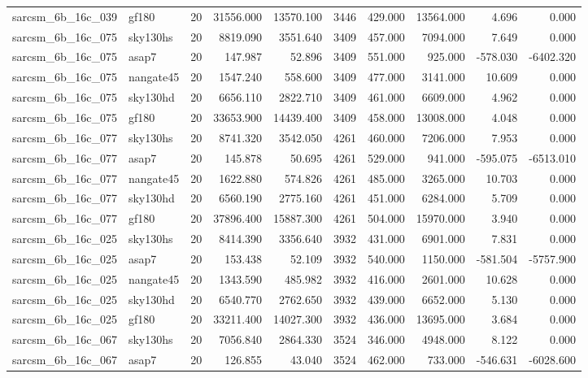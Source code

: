 \begin{longtable}{llrrrrrrrr}
sarcsm\_6b\_16c\_039 & gf180 & 20 & 31556.000 & 13570.100 & 3446 & 429.000 & 13564.000 & 4.696 & 0.000 \\
sarcsm\_6b\_16c\_075 & sky130hs & 20 & 8819.090 & 3551.640 & 3409 & 457.000 & 7094.000 & 7.649 & 0.000 \\
sarcsm\_6b\_16c\_075 & asap7 & 20 & 147.987 & 52.896 & 3409 & 551.000 & 925.000 & -578.030 & -6402.320 \\
sarcsm\_6b\_16c\_075 & nangate45 & 20 & 1547.240 & 558.600 & 3409 & 477.000 & 3141.000 & 10.609 & 0.000 \\
sarcsm\_6b\_16c\_075 & sky130hd & 20 & 6656.110 & 2822.710 & 3409 & 461.000 & 6609.000 & 4.962 & 0.000 \\
sarcsm\_6b\_16c\_075 & gf180 & 20 & 33653.900 & 14439.400 & 3409 & 458.000 & 13008.000 & 4.048 & 0.000 \\
sarcsm\_6b\_16c\_077 & sky130hs & 20 & 8741.320 & 3542.050 & 4261 & 460.000 & 7206.000 & 7.953 & 0.000 \\
sarcsm\_6b\_16c\_077 & asap7 & 20 & 145.878 & 50.695 & 4261 & 529.000 & 941.000 & -595.075 & -6513.010 \\
sarcsm\_6b\_16c\_077 & nangate45 & 20 & 1622.880 & 574.826 & 4261 & 485.000 & 3265.000 & 10.703 & 0.000 \\
sarcsm\_6b\_16c\_077 & sky130hd & 20 & 6560.190 & 2775.160 & 4261 & 451.000 & 6284.000 & 5.709 & 0.000 \\
sarcsm\_6b\_16c\_077 & gf180 & 20 & 37896.400 & 15887.300 & 4261 & 504.000 & 15970.000 & 3.940 & 0.000 \\
sarcsm\_6b\_16c\_025 & sky130hs & 20 & 8414.390 & 3356.640 & 3932 & 431.000 & 6901.000 & 7.831 & 0.000 \\
sarcsm\_6b\_16c\_025 & asap7 & 20 & 153.438 & 52.109 & 3932 & 540.000 & 1150.000 & -581.504 & -5757.900 \\
sarcsm\_6b\_16c\_025 & nangate45 & 20 & 1343.590 & 485.982 & 3932 & 416.000 & 2601.000 & 10.628 & 0.000 \\
sarcsm\_6b\_16c\_025 & sky130hd & 20 & 6540.770 & 2762.650 & 3932 & 439.000 & 6652.000 & 5.130 & 0.000 \\
sarcsm\_6b\_16c\_025 & gf180 & 20 & 33211.400 & 14027.300 & 3932 & 436.000 & 13695.000 & 3.684 & 0.000 \\
sarcsm\_6b\_16c\_067 & sky130hs & 20 & 7056.840 & 2864.330 & 3524 & 346.000 & 4948.000 & 8.122 & 0.000 \\
sarcsm\_6b\_16c\_067 & asap7 & 20 & 126.855 & 43.040 & 3524 & 462.000 & 733.000 & -546.631 & -6028.600 \\

\end{longtable}
